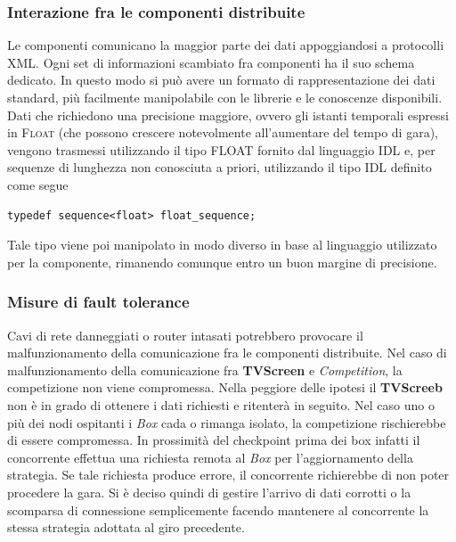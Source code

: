\subsubsection{Interazione fra le componenti distribuite}
Le componenti comunicano la maggior parte dei dati appoggiandosi a protocolli XML. Ogni set di informazioni scambiato fra componenti ha il suo schema dedicato. In questo
modo si pu\`{o} avere un formato di rappresentazione dei dati standard, pi\`{u} facilmente manipolabile con le librerie e le conoscenze disponibili. 
Dati che richiedono una precisione maggiore, ovvero gli istanti temporali espressi in \textsc{Float} (che possono crescere notevolmente all'aumentare del tempo di gara),
vengono trasmessi utilizzando il tipo FLOAT fornito dal linguaggio IDL e, per sequenze di lunghezza non conosciuta a priori, utilizzando il tipo IDL definito come segue
\begin{lstlisting}
typedef sequence<float> float_sequence;
\end{lstlisting}
Tale tipo viene poi manipolato in modo diverso in base al linguaggio utilizzato per la componente, rimanendo comunque entro un buon margine di precisione.
\subsubsection{Misure di fault tolerance}
Cavi di rete danneggiati o router intasati potrebbero provocare il malfunzionamento della comunicazione fra le componenti distribuite. Nel caso di malfunzionamento
della comunicazione fra \textbf{TVScreen} e \emph{Competition}, la competizione non viene compromessa. Nella peggiore delle ipotesi il \textbf{TVScreeb} non \`{e} in grado
di ottenere i dati richiesti e ritenter\`{a} in seguito. Nel caso uno o pi\`{u} dei nodi ospitanti i \emph{Box} cada o rimanga isolato, la competizione rischierebbe
di essere compromessa. In prossimit\`{a} del checkpoint prima dei box infatti il concorrente effettua una richiesta remota al \emph{Box} per l'aggiornamento della strategia.
Se tale richiesta produce errore, il concorrente richierebbe di non poter procedere la gara. Si \`{e} deciso quindi di gestire l'arrivo di dati corrotti o la scomparsa di 
connessione semplicemente facendo mantenere al concorrente la stessa strategia adottata al giro precedente.
